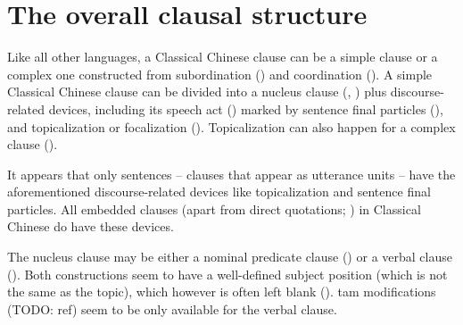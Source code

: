 \documentclass[UTF8, a4paper, oneside, scheme=plain, 12pt]{ctexrep}
\begin{document}
\section{The overall clausal structure}\label{sec:grammatical.clause}

Like all other languages, a Classical Chinese clause can be a simple clause
or a complex one constructed from subordination ()
and coordination ().
A simple Classical Chinese clause can be divided into a nucleus clause (, )
plus discourse-related devices,
including its speech act () marked by sentence final particles (),
and topicalization or focalization ().
Topicalization can also happen for a complex clause ().

It appears that only sentences -- clauses that appear as utterance units -- have the aforementioned discourse-related devices like topicalization and sentence final particles.
All embedded clauses (apart from direct quotations; ) in Classical Chinese do have these devices.

The nucleus clause may be either a nominal predicate clause ()
or a verbal clause ().
Both constructions seem to have a well-defined subject position (which is not the same as the topic),
which however is often left blank ().
\Ac{tam} modifications (TODO: ref) seem to be only available for the verbal clause.
\end{document}
